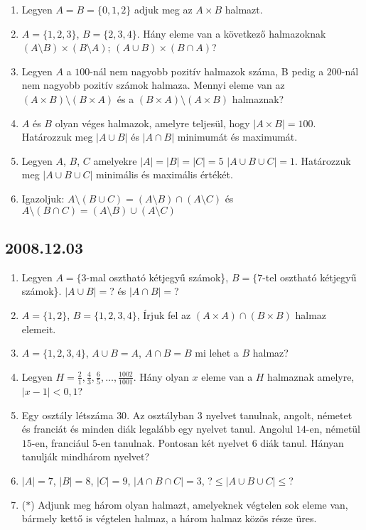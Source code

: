 \begin{enumerate}
\item Legyen $A{=}B{=}\{0,1,2\}$ adjuk meg az $A{\times}B$ halmazt.

\item $A{=}\{1,2,3\}$, $B{=}\{2,3,4\}$. Hány eleme van a következő halmazoknak $(A{\setminus}B){\times}(B{\setminus}A)$; $(A{\cup}B){\times}(B{\cap}A)$?

\item Legyen $A$ a $100$-nál nem nagyobb pozitív halmazok száma, B pedig a $200$-nál nem nagyobb pozitív számok halmaza. Mennyi eleme van  az $(A{\times}B){\setminus}(B{\times}A)$ és a $(B{\times}A){\setminus}(A{\times}B)$ halmaznak?

\item $A$ és $B$ olyan véges halmazok, amelyre teljesül, hogy $|A{\times}B|{=}100$. Határozzuk meg $|A{\cup}B|$ és $|A{\cap}B|$ minimumát és maximumát.

\item Legyen $A$, $B$, $C$ amelyekre $|A|{=}|B|{=}|C|{=}5$ $|A{\cup}B{\cup}C|{=}1$. Határozzuk meg $|A{\cup}B{\cup}C|$ minimális és maximális értékét.

\item  Igazoljuk: $A{\setminus}(B{\cup}C){=}(A{\setminus}B){\cap}(A{\setminus}C)$ és $A{\setminus}(B{\cap}C){=}(A{\setminus}B){\cup}(A{\setminus}C)$
\end{enumerate}

\subsection*{2008.12.03}
\begin{enumerate}
\item Legyen $A{=}\{3$-mal osztható kétjegyű számok\}, $B{=}\{7$-tel osztható kétjegyű számok\}. $|A{\cup}B|{=}$? és $|A{\cap}B|{=}$?

\item $A{=}\{1,2\}$, $B{=}\{1,2,3,4\}$, Írjuk fel az $(A{\times}A){\cap}(B{\times}B)$ halmaz elemeit.

\item $A{=}\{1,2,3,4\}$, $A{\cup}B{=}A$, $A{\cap}B{=}B$ mi lehet a $B$ halmaz?

\item Legyen $H{=}{\frac{2}{1}, \frac{4}{3}, \frac{6}{5}, {\ldots}, \frac{1002}{1001}}$. Hány olyan $x$ eleme van a $H$ halmaznak amelyre, $|x-1|<0,1$?

\item Egy osztály létszáma $30$. Az osztályban $3$ nyelvet tanulnak, angolt, németet és franciát és minden diák legalább egy nyelvet tanul. Angolul $14$-en, németül $15$-en, franciául $5$-en tanulnak. Pontosan két  nyelvet $6$ diák tanul. Hányan tanulják mindhárom nyelvet?

\item $|A|{=}7$, $|B|{=}8$, $|C|{=}9$, $|A{\cap}B{\cap}C|{=}3$,  ?${\le} |A{\cup}B{\cup}C|{\le}$?

\item ($*$) Adjunk meg három olyan halmazt, amelyeknek végtelen sok eleme van, bármely kettő is végtelen halmaz, a három halmaz közös része üres.
\end{enumerate}


